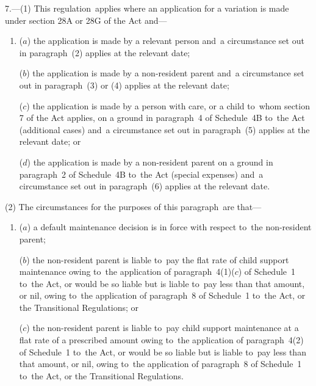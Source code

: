 \documentclass[12pt,a4paper]{article}
\begin{document}
7.---(1)  This regulation~applies where an application for a variation is made under 
section 28A or 28G  %
of the Act and—
\begin{enumerate}\item[]
($a$) the application is made by a relevant person and~a circumstance set out in paragraph~(2) applies at the relevant date;

($b$) the application is made by a non-resident parent and~a circumstance set out in paragraph~(3) or (4) applies at the relevant date;

($c$) the application is made by a person with care, or a child to~whom section 7 of the Act applies, on a ground in paragraph~4 of Schedule~4B to~the Act (additional cases) and~a circumstance set out in paragraph~(5) applies at the relevant date; or

($d$) the application is made by a non-resident parent on a ground in paragraph~2 of Schedule~4B to~the Act (special expenses) and~a circumstance set out in paragraph~(6) applies at the relevant date.
\end{enumerate}

(2) The circumstances for the purposes of this paragraph~are that—
\begin{enumerate}\item[]
($a$) a default maintenance decision is in force with respect to~the non-resident parent;

($b$) the non-resident parent is liable to~pay the flat rate of child support maintenance owing to~the application of paragraph~4(1)($c$)  of Schedule~1 to~the Act, or would be so liable but is liable to~pay less than that amount, or nil, owing to~the application of paragraph~8 of Schedule~1 to~the Act, or the Transitional Regulations; or

($c$) the non-resident parent is liable to~pay child support maintenance at a flat rate of a prescribed amount owing to~the application of paragraph~4(2) of Schedule~1 to~the Act, or would be so liable but is liable to~pay less than that amount, or nil, owing to~the application of paragraph~8 of Schedule~1 to~the Act, or the Transitional Regulations.
\end{enumerate}
\end{document}

